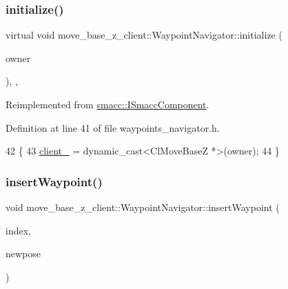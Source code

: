 \subsubsection{\texorpdfstring{initialize()}{initialize()}}
{\footnotesize\ttfamily virtual void move\+\_\+base\+\_\+z\+\_\+client\+::\+Waypoint\+Navigator\+::initialize (\begin{DoxyParamCaption}\item[{\hyperlink{classsmacc_1_1ISmaccClient}{smacc\+::\+I\+Smacc\+Client} $\ast$}]{owner }\end{DoxyParamCaption})\hspace{0.3cm}{\ttfamily [inline]}, {\ttfamily [override]}, {\ttfamily [virtual]}}



Reimplemented from \hyperlink{classsmacc_1_1ISmaccComponent_a3378552cb1a86aa26a07c0edc057448b}{smacc\+::\+I\+Smacc\+Component}.



Definition at line 41 of file waypoints\+\_\+navigator.\+h.


\begin{DoxyCode}
42   \{
43     \hyperlink{classmove__base__z__client_1_1WaypointNavigator_aadb289ffdaeda3a751fe569a2ee84c48}{client\_} = \textcolor{keyword}{dynamic\_cast<}ClMoveBaseZ *\textcolor{keyword}{>}(owner);
44   \}
\end{DoxyCode}
\mbox{\label{classmove__base__z__client_1_1WaypointNavigator_a92b16647ad59ca96f37211db34a32405}} 
\subsubsection{\texorpdfstring{insert\+Waypoint()}{insertWaypoint()}}
{\footnotesize\ttfamily void move\+\_\+base\+\_\+z\+\_\+client\+::\+Waypoint\+Navigator\+::insert\+Waypoint (\begin{DoxyParamCaption}\item[{int}]{index,  }\item[{geometry\+\_\+msgs\+::\+Pose \&}]{newpose }\end{DoxyParamCaption})}



